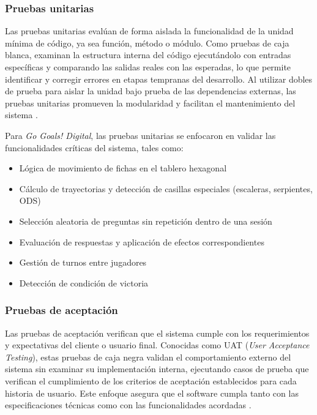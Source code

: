 \subsubsection{Pruebas unitarias}
\label{subsubsec:pruebas_unitarias}

Las pruebas unitarias evalúan de forma aislada la funcionalidad de la unidad mínima de código, ya sea función, método o módulo. Como pruebas de caja blanca, examinan la estructura interna del código ejecutándolo con entradas específicas y comparando las salidas reales con las esperadas, lo que permite identificar y corregir errores en etapas tempranas del desarrollo. Al utilizar dobles de prueba para aislar la unidad bajo prueba de las dependencias externas, las pruebas unitarias promueven la modularidad y facilitan el mantenimiento del sistema \parencite{Pressman2019}.

Para \textit{Go Goals! Digital}, las pruebas unitarias se enfocaron en validar las funcionalidades críticas del sistema, tales como:

\begin{itemize}
    \item Lógica de movimiento de fichas en el tablero hexagonal
    \item Cálculo de trayectorias y detección de casillas especiales (escaleras, serpientes, ODS)
    \item Selección aleatoria de preguntas sin repetición dentro de una sesión
    \item Evaluación de respuestas y aplicación de efectos correspondientes
    \item Gestión de turnos entre jugadores
    \item Detección de condición de victoria
\end{itemize}

\subsubsection{Pruebas de aceptación}
\label{subsubsec:pruebas_aceptacion}

Las pruebas de aceptación verifican que el sistema cumple con los requerimientos y expectativas del cliente o usuario final. Conocidas como UAT (\textit{User Acceptance Testing}), estas pruebas de caja negra validan el comportamiento externo del sistema sin examinar su implementación interna, ejecutando casos de prueba que verifican el cumplimiento de los criterios de aceptación establecidos para cada historia de usuario. Este enfoque asegura que el software cumpla tanto con las especificaciones técnicas como con las funcionalidades acordadas \parencite{Pressman2019}.

